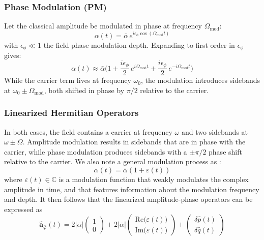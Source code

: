 \subsubsection*{Phase Modulation (PM)}
Let the classical amplitude be modulated in phase at frequency $\Omega_{\mathrm{mod}}$:
\begin{equation}
\alpha(t) = \bar{\alpha} \, e^{i \epsilon_{\phi} \cos(\Omega_{\mathrm{mod}} t)}
\label{eq:PM_def}
\end{equation}
with $\epsilon_{\phi} \ll 1$ the field phase modulation depth. Expanding to first order in $\epsilon_{\phi}$ gives:
\begin{equation}
\alpha(t) \approx \bar{\alpha} \Big( 1 + \frac{i \epsilon_{\phi} }{2} \, e^{i\Omega_{\mathrm{mod}} t} + \frac{i \epsilon_{\phi} }{2} \, e^{-i\Omega_{\mathrm{mod}} t} \Big)
\label{eq:PM_expand}
\end{equation}
While the carrier term lives at frequency $\omega_0$, the modulation introduces sidebands at $\omega_0 \pm \Omega_{\mathrm{mod}}$, both shifted in phase by $\pi/2$ relative to the carrier.

\subsubsection{Linearized Hermitian Operators}
In both cases, the field contains a carrier at frequency $\omega$ and two sidebands at $\omega \pm \Omega$. Amplitude modulation results in sidebands that are in phase with the carrier, while phase modulation produces sidebands with a $\pm \pi/2$ phase shift relative to the carrier. We also note a general modulation process as :
\begin{equation}
\alpha(t) = \bar{\alpha} \left(1 + \varepsilon(t) \right)
\end{equation}
where $\varepsilon(t) \in \mathbb{C}$ is a modulation function that weakly modulates the complex amplitude in time, and that features information about the modulation frequency and depth. It then follows that the linearized amplitude-phase operators can be expressed as
\begin{equation}
\hat{\mathbf a}_{\bar{\varphi}} (t) = 2|\bar{\alpha}| \begin{pmatrix}
  1 \\ 0 
\end{pmatrix} + 2|\bar{\alpha}|\begin{pmatrix}
  \mathrm{Re}\big(\varepsilon(t) \big) \\
  \mathrm{Im}\big(\varepsilon(t) \big)
\end{pmatrix}
+ \begin{pmatrix}
  \delta \hat{p}(t) \\
  \delta \hat{q}(t)
\end{pmatrix}
\end{equation}

